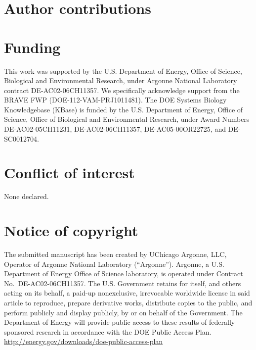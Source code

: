 \section{Author contributions}

\section{Funding}
This work was supported by the U.S. Department of Energy, Office of Science,
Biological and Environmental Research, under Argonne National Laboratory
contract DE-AC02-06CH11357. We specifically acknowledge support from the BRAVE
FWP (DOE-112-VAM-PRJ1011481). The DOE Systems Biology Knowledgebase (KBase) is
funded by the U.S. Department of Energy, Office of Science, Office of
Biological and Environmental Research, under Award Numbers DE-AC02-05CH11231,
DE-AC02-06CH11357, DE-AC05-00OR22725, and DE-SC0012704.

\section{Conflict of interest}
None declared.

\section{Notice of copyright}
The submitted manuscript has been created by UChicago Argonne, LLC, Operator of
Argonne National Laboratory (``Argonne''). Argonne, a U.S. Department of Energy
Office of Science laboratory, is operated under Contract
No.~DE-AC02-06CH11357. The U.S. Government retains for itself, and others
acting on its behalf, a paid-up nonexclusive, irrevocable worldwide license in
said article to reproduce, prepare derivative works, distribute copies to the
public, and perform publicly and display publicly, by or on behalf of the
Government. The Department of Energy will provide public access to these
results of federally sponsored research in accordance with the DOE Public
Access Plan. \url{http://energy.gov/downloads/doe-public-access-plan}
